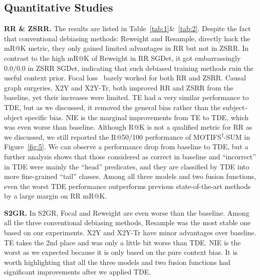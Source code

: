 \documentclass[10pt,twocolumn,letterpaper]{article}
\begin{document}
\vspace{-0.05in}
\subsection{Quantitative Studies}
\vspace{-0.05in}
\noindent\textbf{RR \& ZSRR.} The results are listed in Table~\ref{tab:1}\&~\ref{tab:2}. Despite the fact that conventional debiasing methods: Reweight and Resample, directly hack the mR@K metric, they only gained limited advantages in RR but not in ZSRR. In contrast to the high mR@K of Reweight in RR SGDet, it got embarrassingly $0.0/0.0$ in ZSRR SGDet, indicating that such debiased training methods ruin the useful context prior. Focal loss~\cite{lin2017focal} barely worked for both RR and ZSRR. Causal graph surgeries, X2Y and X2Y-Tr, both improved RR and ZSRR from the baseline, yet their increases were limited. TE had a very similar performance to TDE, but as we discussed, it removed the general bias rather than the subject-object specific bias. NIE is the marginal improvements from TE to TDE, which was even worse than baseline. Although R@K is not a qualified metric for RR as we discussed, we still reported the R@50/100 performance of MOTIFS\textsuperscript{$\dagger$}-SUM in Figure~\ref{fig:5}. We can observe a performance drop from baseline to TDE, but a further analysis shows that those considered as correct in baseline and ``incorrect'' in TDE were mainly the ``head'' predicates, and they are classified by TDE into more fine-grained ``tail'' classes. Among all three models and two fusion functions, even the worst TDE performance outperforms previous state-of-the-art methods~\cite{tang2019learning, chen2019knowledge} by a large margin on RR mR@K.

\noindent\textbf{S2GR.} In S2GR, Focal and Reweight are even worse than the baseline. Among all the three conventional debiasing methods, Resample was the most stable one based on our experiments. X2Y and X2Y-Tr have minor advantages over baseline. TE takes the 2nd place and was only a little bit worse than TDE. NIE is the worst as we expected because it is only based on the pure context bias. It is worth highlighting that all the three models and two fusion functions had significant improvements after we applied TDE.
\end{document}
